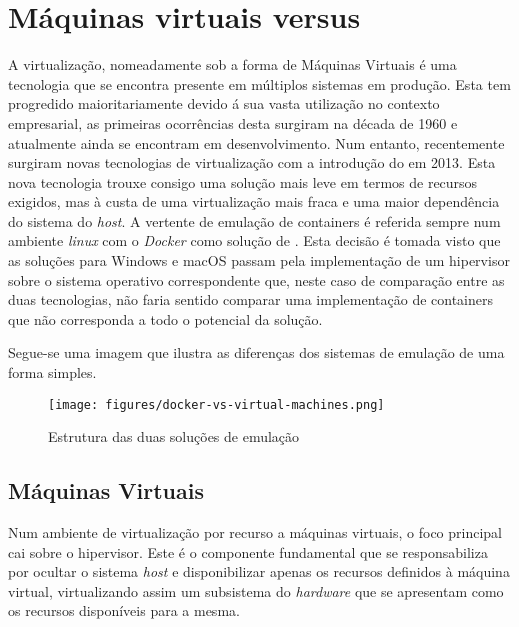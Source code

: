 
\section{Máquinas virtuais versus \conts}

A virtualização, nomeadamente sob a forma de Máquinas Virtuais é uma tecnologia que se encontra presente 
em múltiplos sistemas em produção. Esta tem progredido maioritariamente devido á sua vasta utilização no contexto empresarial, as primeiras ocorrências desta surgiram na década de 1960 e atualmente ainda se encontram em desenvolvimento. Num entanto, recentemente surgiram novas tecnologias de virtualização com a introdução do  \lincont em 2013. Esta nova tecnologia trouxe consigo uma solução mais leve em termos de recursos exigidos, mas à custa de uma virtualização mais fraca e uma maior dependência do sistema do \textit{host}. 
A vertente de emulação de containers é referida sempre num ambiente \textit{linux} com o \textit{Docker} como solução de \conts. Esta decisão é tomada visto que as soluções para Windows e macOS passam pela implementação de um hipervisor sobre o sistema operativo correspondente que, neste caso de comparação entre as duas tecnologias, não faria sentido comparar uma implementação de containers que não corresponda a todo o potencial da solução.

Segue-se uma imagem que ilustra as diferenças dos sistemas de emulação de uma forma simples.


\begin{figure}[H]
	\texttt{[image: figures/docker-vs-virtual-machines.png]}
	\caption{Estrutura das duas soluções de emulação}	
	\label{fig:vms-conts}
\end{figure}

\subsection{Máquinas Virtuais}

Num ambiente de virtualização por recurso a máquinas virtuais, o foco principal cai sobre o hipervisor. Este é o componente fundamental que se responsabiliza por ocultar o sistema \textit{host} e disponibilizar apenas os recursos definidos à máquina virtual, virtualizando assim um subsistema do \textit{hardware} que se apresentam como os recursos disponíveis para a mesma.

\subsection{\Conts } \label{section_conts}

